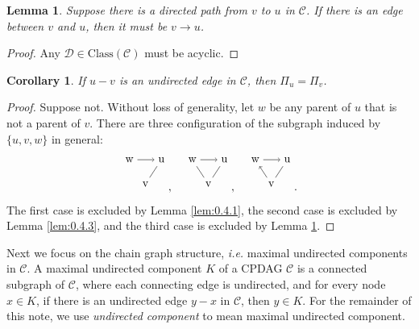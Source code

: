 \documentclass{article}
\newtheorem{corollary}{Corollary}[theorem]
\newtheorem{lemma}{Lemma}[section]
\theoremstyle{definition}
\newcommand{\cC}{\mathcal{C}}
\newcommand{\cD}{\mathcal{D}}
\newcommand{\<}{\left\langle}
\renewcommand{\>}{\right\rangle}
\newcommand{\cls}{\text{Class}}
\begin{document}
\begin{lemma}\label{lem:0.4.4}
    Suppose there is a directed path from $v$ to $u$ in $\cC$. If there is an edge between $v$ and $u$, then it must be $v \rightarrow u$.
\end{lemma}
\begin{proof}
    Any $\cD\in\cls(\cC)$ must be acyclic.
\end{proof}

\begin{corollary}\label{cor:0.4.1.1}
    If $u - v$ is an undirected edge in $\cC$, then $\Pi_u = \Pi_v$.
\end{corollary}
\begin{proof}
    Suppose not. Without loss of generality, let $w$ be any parent of $u$ that is not a parent of $v$. 
    There are three configuration of the subgraph induced by $\{u,v,w\}$ in general: 
    \[\begin{tikzpicture}[scale=0.5]
        \node (w) at (0,0) {w};
        \node (u) at (2,0) {u};
        \node (v) at (1,-1.5) {v};
      
        \draw[->] (w) -- (u);
        \draw (u) -- (v);
      \end{tikzpicture},\quad
    \begin{tikzpicture}[scale=0.5]
        \node (w) at (0,0) {w};
        \node (u) at (2,0) {u};
        \node (v) at (1,-1.5) {v};
      
        \draw[->] (w) -- (u);
        \draw (w) -- (v);
        \draw (u) -- (v);
      \end{tikzpicture},\quad
      \begin{tikzpicture}[scale=0.5]
        \node (w) at (0,0) {w};
        \node (u) at (2,0) {u};
        \node (v) at (1,-1.5) {v};
      
        \draw[->] (w) -- (u);
        \draw[->] (v) -- (w);
        \draw (u) -- (v);
      \end{tikzpicture}.\]
      The first case is excluded by Lemma \ref*{lem:0.4.1}, the second case is excluded by Lemma \ref*{lem:0.4.3}, and the third case is excluded by Lemma \ref*{lem:0.4.4}.
\end{proof}

Next we focus on the chain graph structure, \emph{i.e.} maximal undirected components in $\cC$.
A maximal undirected component $K$ of a CPDAG $\cC$ is a connected subgraph of $\cC$, where each connecting edge is undirected, and for every node $x \in K$, if there is an undirected edge $y-x$ in $\cC$, then $y\in K$.
For the remainder of this note, we use \textit{undirected component} to mean maximal undirected component.
\end{document}

